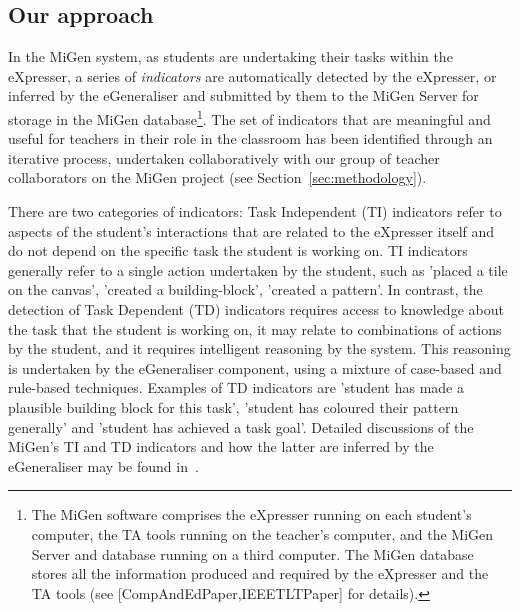 \subsection{Our approach}
\label{sec:our-approach}
 
In the MiGen system, as students are undertaking their tasks within the eXpresser, a series
of {\em indicators} are automatically detected by the eXpresser, or
inferred by the eGeneraliser and submitted by them to the MiGen
Server for storage in the MiGen database\footnote{The MiGen software
  comprises the eXpresser running on each student’s computer, the TA
  tools running on the teacher’s computer, and the MiGen Server and
  database running on a third computer. The MiGen database stores all
  the information produced and required by the eXpresser and the TA
  tools (see [CompAndEdPaper,IEEETLTPaper] for details).}.   
The set of indicators that are meaningful and useful for teachers in
their role in the classroom has been identified through an iterative
process, undertaken collaboratively with our group of teacher
collaborators on the MiGen project (see Section~\ref{sec:methodology}).  

There are two categories of indicators: Task Independent (TI)
indicators refer to aspects of the student's interactions that are
related to the eXpresser itself and do not depend on the specific task
the student is working on. TI indicators generally refer to a single
action undertaken by the student, such as 'placed a tile on the
canvas', 'created a building-block', 'created a pattern'. In contrast,
the detection of Task Dependent (TD) indicators requires access to
knowledge about the task that the student is working on, it may relate
to combinations of actions by the student, and it requires intelligent
reasoning by the system. This reasoning is undertaken by the
eGeneraliser component, using a mixture of case-based and rule-based
techniques. Examples of TD indicators are 'student has made a
plausible building block for this task', 'student has coloured their
pattern generally' and 'student has achieved a task goal'. Detailed
discussions of the MiGen's TI and TD indicators and how the latter are
inferred by the eGeneraliser may be found in~\cite{IEEETLTPaper}.
 
